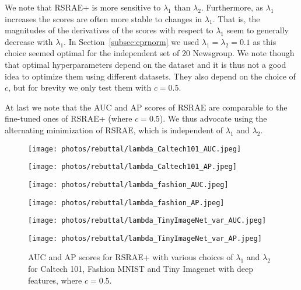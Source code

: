 \documentclass{article} \usepackage{iclr2020_conference,times}
\def\Secref#1{Section~\ref{#1}}
\begin{document}
We note that RSRAE+ is more sensitive to $\lambda_1$ than $\lambda_2$. Furthermore, as $\lambda_1$ increases the scores are often more stable to changes in $\lambda_1$. That is, the magnitudes of the derivatives of the scores with respect to $\lambda_1$ seem to generally decrease with $\lambda_1$. In \Secref{subsec:cprnorm} we used 
$\lambda_1 = \lambda_2 = 0.1$ as this choice seemed optimal for the independent set of 20 Newsgroup. We note though that optimal hyperparameters depend on the dataset and it is thus not a good idea to optimize them using different datasets. They also depend on the choice of $c$, but for brevity we only test them with $c=0.5$.



At last we note that the AUC and AP scores of RSRAE are comparable to the fine-tuned ones of RSRAE+ (where $c=0.5$). We thus advocate using the alternating minimization of RSRAE, which is independent of $\lambda_1$ and $\lambda_2$.


\begin{figure}[htbp]
\centering
\begin{minipage}[t]{0.48\textwidth}
\centering
\texttt{[image: photos/rebuttal/lambda\_Caltech101\_AUC.jpeg]}
\end{minipage}
\begin{minipage}[t]{0.48\textwidth}
\centering
\texttt{[image: photos/rebuttal/lambda\_Caltech101\_AP.jpeg]}
\end{minipage}


\centering
\begin{minipage}[t]{0.48\textwidth}
\centering
\texttt{[image: photos/rebuttal/lambda\_fashion\_AUC.jpeg]}
\end{minipage}
\begin{minipage}[t]{0.48\textwidth}
\centering
\texttt{[image: photos/rebuttal/lambda\_fashion\_AP.jpeg]}
\end{minipage}


\centering
\begin{minipage}[t]{0.48\textwidth}
\centering
\texttt{[image: photos/rebuttal/lambda\_TinyImageNet\_var\_AUC.jpeg]}
\end{minipage}
\begin{minipage}[t]{0.48\textwidth}
\centering
\texttt{[image: photos/rebuttal/lambda\_TinyImageNet\_var\_AP.jpeg]}
\end{minipage}


\caption{AUC and AP scores for RSRAE+ with various choices of $\lambda_1$ and $\lambda_2$ for Caltech 101, Fashion MNIST and Tiny Imagenet with deep features, where $c=0.5$.}
\label{fig:hyperparameters}

\end{figure}
\end{document}
